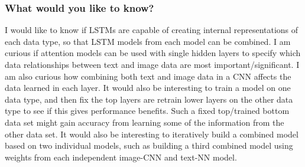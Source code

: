 \subsubsection{What would you like to know?}

I would like to know if LSTMs are capable of creating internal representations of each data type, so that LSTM models from each model can be combined.  I am curious if attention models can be used with single hidden layers to specify which data relationships between text and image data are most important/significant.  I am also curious how combining both text and image data in a CNN affects the data learned in each layer.  It would also be interesting to train a model on one data type, and then fix the top layers are retrain lower layers on the other data type to see if this gives performance benefits.  Such a fixed top/trained bottom data set might gain accuracy from learning some of the information from the other data set.  It would also be interesting to iteratively build a combined model based on two individual models, such as building a third combined model using weights from each independent image-CNN and text-NN model.  
